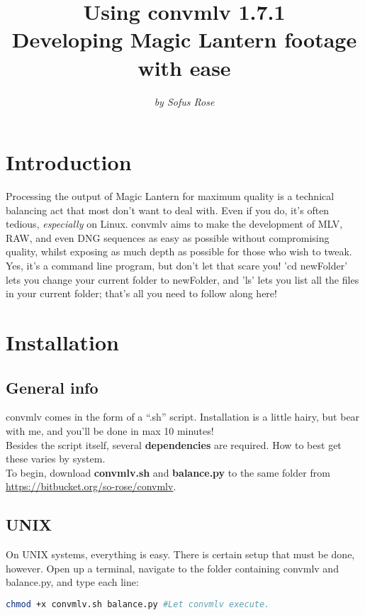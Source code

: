 \documentclass[a4paper,12pt]{article}
\author{\textit{by Sofus Rose}}
\title{\textbf{Using convmlv 1.7.1} \\ {\large Developing Magic Lantern footage with ease}}
\begin{document}
\maketitle{}
\tableofcontents{}
\newpage

\section{Introduction}
	Processing the output of Magic Lantern for maximum quality is a technical balancing act that most don't want to deal with. Even if you
	do, it's often tedious, \textit{especially} on Linux. convmlv aims to make the development of MLV, RAW, and even DNG sequences as easy as
	possible without compromising quality, whilst exposing as much depth as possible for those who wish to tweak.\\
	
	Yes, it's a command line program, but don't let that scare you! 'cd newFolder' lets you change your current folder to newFolder,
	and 'ls' lets you list all the files in your current folder; that's all you need to follow along here!

\section{Installation}
	\subsection{General info}
		convmlv comes in the form of a ``.sh'' script. Installation is a little hairy, but bear with me, and you'll be done in max 10 minutes!\\
		
		Besides the script itself, several \textbf{dependencies} are required. How to best get these varies by system.\\
		
		To begin, download \textbf{convmlv.sh} and \textbf{balance.py} to the same folder from \url{https://bitbucket.org/so-rose/convmlv}.
		
	\subsection{UNIX}
		On UNIX systems, everything is easy. There is certain setup that must be done, however. Open up a terminal, navigate to the folder containing
		convmlv and balance.py, and type each line:
		
\begin{lstlisting}[language=bash]
	chmod +x convmlv.sh balance.py #Let convmlv execute.
\end{lstlisting}
		
\end{document}
